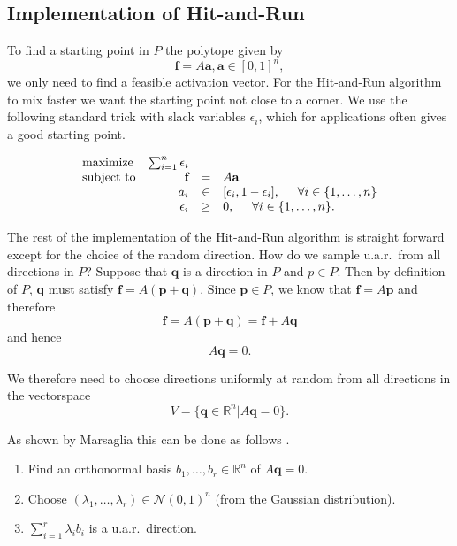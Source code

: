 \subsection{Implementation of Hit-and-Run}
To find a starting point in $P$ the polytope given by
\[\textbf{f} = A\textbf{a}, \textbf{a} \in [0,1]^n,\]
we only need to find a feasible activation vector. For the Hit-and-Run algorithm to mix faster we want the starting point not close to a corner. %
We use the following standard trick with slack variables $\epsilon_i$, which for applications often gives a good starting point.%

\begin{equation}\label{eq:LP_r}
\begin{array}{lrcl}
\mbox{maximize} & \sum_{i=1}^n \epsilon_i \\ 
\mbox{subject to} & \textbf{f} &=& A\textbf{a}\\
  & a_i &\in& [\epsilon_i, 1- \epsilon_i], \hspace{5mm} \forall i \in \{1,\dots,n\}  \\
  & \epsilon_i &\geq& 0, \hspace{5mm} \forall i \in \{1,\dots,n\}.  
\end{array}
\end{equation}


The rest of the implementation of the Hit-and-Run algorithm is straight forward except for the choice of the random direction. How do we sample u.a.r.\ from all directions in $P$? Suppose that $\textbf{q}$ is a direction in $P$ and $p \in P$. Then by definition of $P$, $\textbf{q}$ must satisfy $\textbf{f} = A(\textbf{p}+\textbf{q})$. Since $\textbf{p} \in P$, we know that $\textbf{f} = A\textbf{p}$ and therefore 
\[\textbf{f} = A(\textbf{p} + \textbf{q}) = \textbf{f} + A\textbf{q}\]
and hence
\[A\textbf{q} = 0.\]

We therefore need to choose directions uniformly at random from all directions in the vectorspace 
\[V = \{\textbf{q} \in \mathbb{R}^n | A\textbf{q} = 0\}.\]

As shown by Marsaglia this can be done as follows \cite{Marsaglia}.

\begin{enumerate}
\item
Find an orthonormal basis $b_1, \dots, b_r \in \mathbb{R}^{n}$ of $A\textbf{q} =0$.
\item
Choose $(\lambda_1, \dots, \lambda_r) \in \mathcal{N}(0,1)^n$ (from the Gaussian distribution).
\item
$\sum_{i=1}^r \lambda_i b_i$ is a u.a.r.\ direction.
\end{enumerate}

